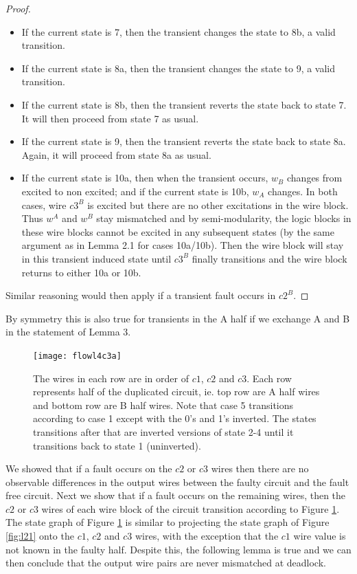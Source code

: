 \documentclass[12pt]{report}
\begin{document}
\begin{proof}
\begin{itemize}
	\item
If the current state is 7, then the transient changes the state to 8b, a valid transition.	
      \item
If the current state is 8a, then the transient changes the state to 9, a valid transition.	
	\item
      If the current state is 8b, then the transient reverts the state back to state 7.  It will then proceed from state 7 as usual.   
	\item
If the current state is 9, then the transient reverts the state back to state 8a.  Again, it will proceed from state 8a as usual.  
	\item
If the current state is 10a, then when the transient occurs, $w_B$ changes from excited to non excited; and if the current state is 10b, $w_A$ changes.  In both cases, wire $c3^B$ is excited but there are no other excitations in the wire block.  Thus $w^A$ and $w^B$ stay mismatched and by semi-modularity, the logic blocks in these wire blocks cannot be excited in any subsequent states (by the same argument as in Lemma 2.1 for cases 10a/10b).  Then the wire block will stay in this transient induced state until $c3^B$ finally transitions and the wire block returns to either 10a or 10b.
\end{itemize}
Similar reasoning would then apply if a transient fault occurs in $c2^B$.  
\end{proof}
By symmetry this is also true for transients in the A half if we exchange A and B in the statement of Lemma 3.\\

\begin{figure}
  \centering
    \texttt{[image: flowl4c3a]}
  \caption{The wires in each row are in order of $c1$, $c2$ and $c3$.  Each row represents half of the duplicated circuit, ie. top row are A half wires and bottom row are B half wires.  Note that case 5 transitions according to case 1 except with the 0's and 1's inverted.  The states transitions after that are inverted versions of state 2-4 until it transitions back to state 1 (uninverted).}
  \label{fig:l4}
\end{figure}

We showed that if a fault occurs on the $c2$ or $c3$ wires then there are no observable differences in the output wires between the faulty circuit and the fault free circuit.  
Next we show that if a fault occurs on the remaining wires, then the $c2$ or $c3$ wires of each wire block of the circuit transition according to Figure \ref{fig:l4}.  The state graph of Figure \ref{fig:l4} is similar to projecting the state graph of Figure \ref{fig:l21} onto the $c1$, $c2$ and $c3$ wires, with the exception that the $c1$ wire value is not known in the faulty half.  Despite this, the following lemma is true and we can then conclude that the output wire pairs are never mismatched at deadlock.  
\end{document}

